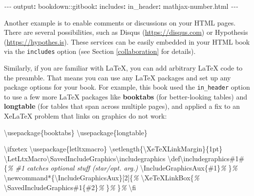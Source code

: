 \documentclass[
  12pt,
]{krantz}
\newenvironment{Shaded}{\begin{snugshade}}{\end{snugshade}}
\newcommand{\AttributeTok}[1]{\textcolor[rgb]{0.77,0.63,0.00}{#1}}
\newcommand{\BuiltInTok}[1]{#1}
\newcommand{\CommentTok}[1]{\textcolor[rgb]{0.56,0.35,0.01}{\textit{#1}}}
\newcommand{\ExtensionTok}[1]{#1}
\newcommand{\FunctionTok}[1]{\textcolor[rgb]{0.00,0.00,0.00}{#1}}
\newcommand{\KeywordTok}[1]{\textcolor[rgb]{0.13,0.29,0.53}{\textbf{#1}}}
\newcommand{\NormalTok}[1]{#1}
\newcommand{\PreprocessorTok}[1]{\textcolor[rgb]{0.56,0.35,0.01}{\textit{#1}}}
\theoremstyle{definition}
\theoremstyle{definition}
\theoremstyle{definition}
\theoremstyle{definition}
\theoremstyle{remark}
\begin{document}
\begin{Shaded}
\begin{Highlighting}[]
\PreprocessorTok{{-}{-}{-}}
\FunctionTok{output}\KeywordTok{:}
\AttributeTok{  bookdown:}\FunctionTok{:gitbook}\KeywordTok{:}
\AttributeTok{    }\FunctionTok{includes}\KeywordTok{:}
\AttributeTok{      }\FunctionTok{in\_header}\KeywordTok{:}\AttributeTok{ mathjax{-}number.html}
\PreprocessorTok{{-}{-}{-}}
\end{Highlighting}
\end{Shaded}

Another example is to enable comments or discussions on your HTML pages. There are several possibilities, such as Disqus (\url{https://disqus.com}) or Hypothesis (\url{https://hypothes.is}). These services can be easily embedded in your HTML book via the \texttt{includes} option (see Section \ref{collaboration} for details).

Similarly, if you are familiar with LaTeX, you can add arbitrary LaTeX code to the preamble. That means you can use any LaTeX packages and set up any package options for your book. For example, this book used the \texttt{in\_header} option to use a few more LaTeX packages like \textbf{booktabs} (for better-looking tables) and \textbf{longtable} (for tables that span across multiple pages), and applied a fix to an XeLaTeX problem that links on graphics do not work:

\begin{Shaded}
\begin{Highlighting}[]
\BuiltInTok{\textbackslash{}usepackage}\NormalTok{\{}\ExtensionTok{booktabs}\NormalTok{\}}
\BuiltInTok{\textbackslash{}usepackage}\NormalTok{\{}\ExtensionTok{longtable}\NormalTok{\}}

\FunctionTok{\textbackslash{}ifxetex}
  \BuiltInTok{\textbackslash{}usepackage}\NormalTok{\{}\ExtensionTok{letltxmacro}\NormalTok{\}}
  \FunctionTok{\textbackslash{}setlength}\NormalTok{\{}\FunctionTok{\textbackslash{}XeTeXLinkMargin}\NormalTok{\}\{1pt\}}
  \FunctionTok{\textbackslash{}LetLtxMacro\textbackslash{}SavedIncludeGraphics\textbackslash{}includegraphics}
  \FunctionTok{\textbackslash{}def\textbackslash{}includegraphics}\NormalTok{\#1\#\{}\CommentTok{\% \#1 catches optional stuff (star/opt. arg.)}
    \FunctionTok{\textbackslash{}IncludeGraphicsAux}\NormalTok{\{\#1\}}\CommentTok{\%}
\NormalTok{  \}}\CommentTok{\%}
  \FunctionTok{\textbackslash{}newcommand*}\NormalTok{\{}\ExtensionTok{\textbackslash{}IncludeGraphicsAux}\NormalTok{\}[2]\{}\CommentTok{\%}
    \FunctionTok{\textbackslash{}XeTeXLinkBox}\NormalTok{\{}\CommentTok{\%}
      \FunctionTok{\textbackslash{}SavedIncludeGraphics}\NormalTok{\#1\{\#2\}}\CommentTok{\%}
\NormalTok{    \}}\CommentTok{\%}
\NormalTok{  \}}\CommentTok{\%}
\FunctionTok{\textbackslash{}fi}
\end{Highlighting}
\end{Shaded}
\end{document}
